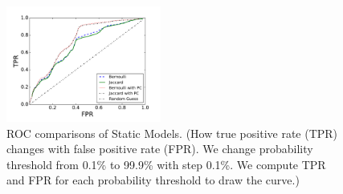 \begin{figure}[t!]
\begin{center}
\includegraphics[width=2in]{figure/predict}
\vspace{-0.1in}
\caption{ROC comparisons of Static Models. 
(How true positive rate (TPR) changes with false positive rate (FPR). 
We change probability threshold from 0.1\% to 99.9\% with step 0.1\%. 
We compute TPR and FPR for each probability threshold to draw the curve.)
}
\label{fig:predict}
\end{center}
\vspace{-0.1in}
\end{figure}